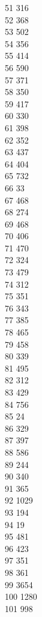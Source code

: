 { 51	316 \\
 52	368 \\
 53	502 \\
 54	356 \\
 55	414 \\
 56	590 \\
 57	371 \\
 58	350 \\
 59	417 \\
 60	330 \\
 61	398 \\
 62	352 \\
 63	437 \\
 64	404 \\
 65	732 \\
 66	33 \\
 67	468 \\
 68	274 \\
 69	468 \\
 70	406 \\
 71	470 \\
 72	324 \\
 73	479 \\
 74	312 \\
 75	351 \\
 76	343 \\
 77	385 \\
 78	465 \\
 79	458 \\
 80	339 \\
 81	495 \\
 82	312 \\
 83	429 \\
 84	756 \\
 85	24 \\
 86	329 \\
 87	397 \\
 88	586 \\
 89	244 \\
 90	340 \\
 91	365 \\
 92	1029 \\
 93	194 \\
 94	19 \\
 95	481 \\
 96	423 \\
 97	351 \\
 98	361 \\
 99	3654 \\
 100	1280 \\
 101	998 \\
}
